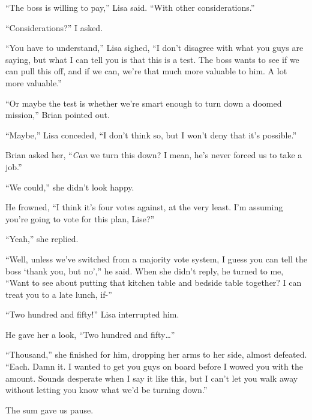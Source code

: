 ``The boss is willing to pay,'' Lisa said.  ``With other considerations.''



``Considerations?'' I asked.



``You have to understand,'' Lisa sighed, ``I don't disagree with what you guys are saying, but what I can tell you is that this is a test.  The boss wants to see if we can pull this off, and if we can, we're that much more valuable to him.  A lot more valuable.''



``Or maybe the test is whether we're smart enough to turn down a doomed mission,'' Brian pointed out.



``Maybe,'' Lisa conceded, ``I don't think so, but I won't deny that it's possible.''



Brian asked her, ``\emph{Can} we turn this down?  I mean, he's never forced us to take a job.''



``We could,'' she didn't look happy.



He frowned, ``I think it's four votes against, at the very least.  I'm assuming you're going to vote for this plan, Lise?''



``Yeah,'' she replied.



``Well, unless we've switched from a majority vote system, I guess you can tell the boss `thank you, but no','' he said.  When she didn't reply, he turned to me, ``Want to see about putting that kitchen table and bedside table together?  I can treat you to a late lunch, if-''



``Two hundred and fifty!'' Lisa interrupted him.



He gave her a look, ``Two hundred and fifty\ldots''



``Thousand,'' she finished for him, dropping her arms to her side, almost defeated.  ``Each.  Damn it.  I wanted to get you guys on board before I wowed you with the amount.  Sounds desperate when I say it like this, but I can't let you walk away without letting you know what we'd be turning down.''



The sum gave us pause.



